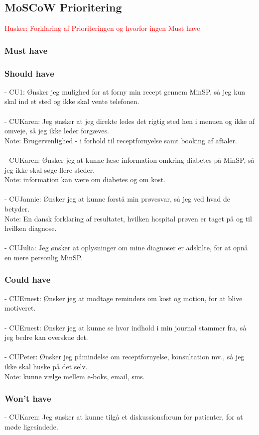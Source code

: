 \subsection{MoSCoW Prioritering}
\textcolor{red}{Husker: Forklaring af Prioriteringen og hvorfor ingen Must have}\\
\subsubsection*{Must have}
\subsubsection*{Should have}
- CU1: Ønsker jeg mulighed for at forny min recept gennem MinSP, så jeg kun skal ind et sted og ikke skal vente telefonen.\\
\\
- CUKaren: Jeg ønsker at jeg direkte ledes det rigtig sted hen i menuen og ikke af omveje, så jeg ikke leder forgæves. \\
Note: Brugervenlighed - i forhold til receptfornyelse samt booking af aftaler.\\
\\ 
- CUKaren: Ønsker jeg at kunne læse information omkring diabetes på MinSP, så jeg ikke skal søge flere steder. \\
Note: information kan være om diabetes og om kost.\\ 
\\
- CUJannie: Ønsker jeg at kunne forstå min prøvesvar, så jeg ved hvad de betyder. \\
Note: En dansk forklaring af resultatet, hvilken hospital prøven er taget på og til hvilken diagnose. \\
\\
- CUJulia: Jeg ønsker at oplysninger om mine diagnoser er adskilte, for at opnå en mere personlig MinSP.


\subsubsection*{Could have}
- CUErnest: Ønsker jeg at modtage reminders om kost og motion, for at blive motiveret.\\
\\
- CUErnest: Ønsker jeg at kunne se hvor indhold i min journal stammer fra, så jeg bedre kan overskue det.\\
\\
- CUPeter: Ønsker jeg påmindelse om receptfornyelse, konsultation mv., så jeg ikke skal huske på det selv.\\ 
Note: kunne vælge mellem e-boks, email, sms.\\
\subsubsection*{Won't have}
- CUKaren: Jeg ønsker at kunne tilgå et diskussionsforum for patienter, for at møde ligesindede.\\